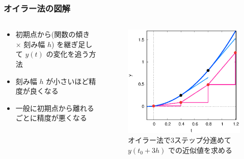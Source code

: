 \documentclass[dvipdfmx,aspectratio=169,20pt]{beamer}
\newcommand{\myfontsetting}[3]{{\fontsize{#1}{#2}\selectfont #3}}
\begin{document}
\begin{frame}
\frametitle{\myfontsetting{28pt}{28pt}{オイラー法の図解}}
\begin{columns}[t]
\begin{column}{0.48\textwidth} 
\vspace{-7mm}
\begin{itemize}
    \item 
    \myfontsetting{13pt}{13pt}{
    初期点から(関数の傾き $\times$ 刻み幅 $h$) を継ぎ足して $y(t)$ の変化を追う方法
    }
    \item \myfontsetting{12pt}{12pt}{
    刻み幅 $h$ が小さいほど精度が良くなる
    }
    \item \myfontsetting{12pt}{12pt}{
    一般に初期点から離れるごとに精度が悪くなる
    }
\end{itemize}
\end{column}
\begin{column}{0.52\textwidth} 
\begin{figure}[h]
	\begin{center}
\vspace{-10mm}
    	\includegraphics[width=1.0\textwidth]{fig12-8_Euler_method.eps}
	\end{center}
	\vspace{-5mm}
	\caption{\myfontsetting{8pt}{8pt}{オイラー法で3ステップ分進めて $y(t_0+3h)$ での近似値を求める %
	}}
\end{figure}
\end{column}
\end{columns}
\end{frame}
\end{document}

